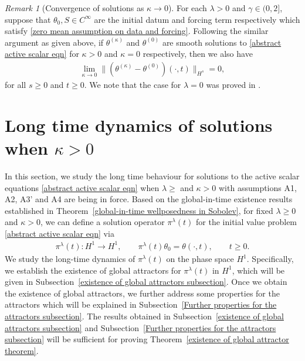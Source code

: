 \documentclass[reqno]{amsart}%
\theoremstyle{definition}
\theoremstyle{remark}
\numberwithin{equation}{section}
\newtheorem{remark}[theorem]{Remark}
\newcommand{\1}{\mathbf{1}}
\newcommand{\pin}{\pi^{\lambda}}
\numberwithin{equation}{section}
\numberwithin{theorem}{section}
\numberwithin{figure}{section}
\begin{document}
\begin{remark}[Convergence of solutions as $\kappa\to0$]
For each $\lambda>0$ and $\gamma\in(0,2]$, suppose that $\theta_0,S\in C^\infty$ are the initial datum and forcing term respectively which satisfy \eqref{zero mean assumption on data and forcing}. Following the similar argument as given above, if $\theta^{(\kappa)}$ and $\theta^{(0)}$ are smooth solutions to \eqref{abstract active scalar eqn} for $\kappa>0$ and $\kappa=0$ respectively, then we also have
\begin{align}\label{Hs convergence thm kappa to 0} 
\lim_{\kappa\rightarrow0}\|(\theta^{(\kappa)}-\theta^{(0)})(\cdot,t)\|_{H^s}=0,
\end{align}
for all $s\ge0$ and $t\ge0$. We note that the case for $\lambda=0$ was proved in \cite[Theorem~2.1]{FS21}.
\end{remark}

\section{Long time dynamics of solutions when $\kappa>0$}\label{long time behaviour and attractors section}

In this section, we study the long time behaviour for solutions to the active scalar equations \eqref{abstract active scalar eqn} when $\lambda\ge$ and $\kappa>0$ with assumptions A1, A2, A3' and A4 are being in force. Based on the global-in-time existence results established in Theorem~\ref{global-in-time wellposedness in Sobolev}, for fixed $\lambda\ge0$ and $\kappa>0$, we can define a solution operator $\pin(t)$ for the initial value problem \eqref{abstract active scalar eqn} via
\begin{align}\label{def of solution map nu>0 and kappa>0}
\pin(t): H^1\to H^1,\qquad \pin(t)\theta_0=\theta(\cdot,t),\qquad t\ge0.
\end{align}
We study the long-time dynamics of $\pin(t)$ on the phase space $H^1$. Specifically, we establish the existence of global attractors for $\pin(t)$ in $H^1$, which will be given in Subsection~\ref{existence of global attractors subsection}. Once we obtain the existence of global attractors, we further address some properties for the attractors which will be explained in Subsection~\ref{Further properties for the attractors subsection}. The results obtained in Subsection~\ref{existence of global attractors subsection} and Subsection~\ref{Further properties for the attractors subsection} will be sufficient for proving Theorem~\ref{existence of global attractor theorem}.
\end{document}
